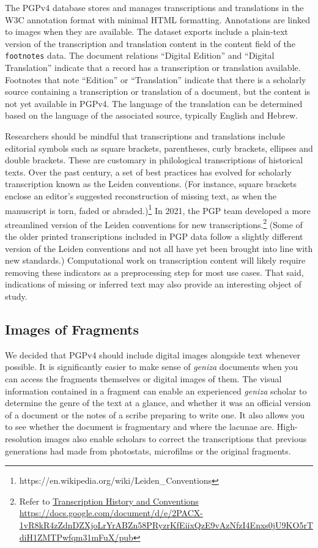 \documentclass{article}
\begin{document}
The PGPv4 database stores and manages transcriptions and translations in the W3C annotation format with minimal HTML formatting. Annotations are linked to images when they are available. The dataset exports include a plain-text version of the transcription and translation content in the content field of the \texttt{footnotes} data. The document relations “Digital Edition” and “Digital Translation” indicate that a record has a  transcription or translation available. Footnotes that note “Edition” or “Translation” indicate that there is a scholarly source containing a transcription or translation of a document, but the content is not yet available in PGPv4. The language of the translation can be determined based on the language of the associated source, typically English and Hebrew.

Researchers should be mindful that transcriptions and translations include editorial symbols such as square brackets, parentheses, curly brackets, ellipses and double brackets. These are customary in philological transcriptions of historical texts. Over the past century, a set of best practices has evolved for scholarly transcription known as the Leiden conventions. (For instance, square brackets enclose an editor’s suggested reconstruction of missing text, as when the manuscript is torn, faded or abraded.)\footnote{https://en.wikipedia.org/wiki/Leiden\_Conventions} In 2021, the PGP team developed a more streamlined version of the Leiden conventions for new transcriptions.\footnote{Refer to \href{https://docs.google.com/document/d/e/2PACX-1vR8kR4zZdnDZXjoLrYrABZn58PRyzrKfEiixQzE9vAzNfzI4Enxs0jU9KO5rTdiH1ZMTPwfqm31mFuX/pub}{Transcription History and Conventions https://docs.google.com/document/d/e/2PACX-1vR8kR4zZdnDZXjoLrYrABZn58PRyzrKfEiixQzE9vAzNfzI4Enxs0jU9KO5rTdiH1ZMTPwfqm31mFuX/pub}} (Some of the older printed transcriptions included in PGP data follow a slightly different version of the Leiden conventions and not all have yet been brought into line with new standards.) Computational work on transcription content will likely require removing these indicators as a preprocessing step for most use cases. That said, indications of missing or inferred text may also provide an interesting object of study.

\subsection{Images of Fragments}

We decided that PGPv4 should include digital images alongside text whenever possible. It is significantly easier to make sense of \textit{geniza} documents when you can access the fragments themselves or digital images of them. The visual information contained in a fragment can enable an experienced \textit{geniza} scholar to determine the genre of the text at a glance, and whether it was an official version of a document or the notes of a scribe preparing to write one. It also allows you to see whether the document is fragmentary and where the lacunae are. High-resolution images also enable scholars to correct the transcriptions that previous generations had made from photostats, microfilms or the original fragments.  
\end{document}
